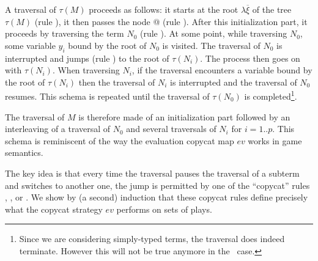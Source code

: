     A traversal of $\tau(M)$ proceeds as follows: it starts at the root $\lambda \overline{\xi}$ of the tree $\tau(M)$ (rule ), it then passes the node @ (rule ).
    After this initialization part, it proceeds by traversing the term $N_0$ (rule ).
    At some point, while traversing $N_0$, some variable $y_i$ bound by the root of $N_0$ is visited. The traversal
    of $N_0$ is interrupted and jumps (rule ) to the root of $\tau(N_i)$. The process then goes on with $\tau(N_i)$.
    When traversing $N_i$, if the traversal encounters a variable bound by the root of $\tau(N_i)$ then the traversal of $N_i$
    is interrupted and
    the traversal of $N_0$ resumes.  This schema is repeated until the traversal of $\tau(N_0)$ is completed\footnote{Since we are considering
    simply-typed terms, the traversal does indeed terminate. However this will not be true anymore in the \pcf\ case.}.

    The traversal of $M$ is therefore made of an initialization part followed by an interleaving of a traversal of $N_0$ and
    several traversals of $N_i$ for $i=1..p$. This schema is reminiscent of the way the evaluation copycat map $ev$ works in game semantics.

    The key idea is that every time the traversal pauses the traversal of a subterm and switches to another one,
    the jump is permitted by one of the ``copycat'' rules , ,  or .
    We show by (a second) induction that these copycat rules define precisely what the copycat strategy $ev$ performs on sets of plays.
\smallskip


